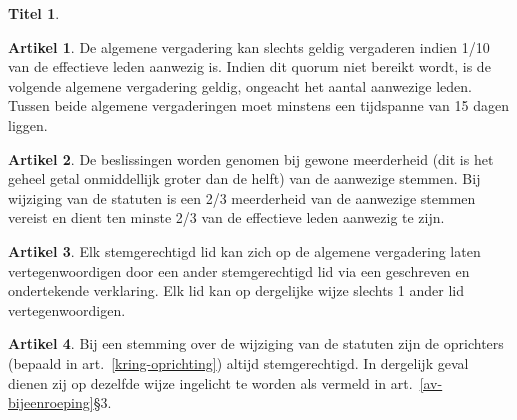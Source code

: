 \documentclass[a4paper,10pt]{article}
\theoremstyle{definition}
\newtheorem{titel}{\newline\Large Titel}
\newtheorem{artikel}{\large Artikel}
\newcommand{\ttextcr}{\hfill\newline}
\begin{document}
\begin{titel}
  \begin{artikel}\ttextcr
    De algemene vergadering kan slechts geldig vergaderen indien 1/10 van de effectieve leden aanwezig is.
    Indien dit quorum niet bereikt wordt, is de volgende algemene vergadering geldig, ongeacht het aantal aanwezige leden.
    Tussen beide algemene vergaderingen moet minstens een tijdspanne van 15 dagen liggen.
  \end{artikel}

  \begin{artikel}\label{av-beslissen}\ttextcr
    De beslissingen worden genomen bij gewone meerderheid (dit is het geheel getal onmiddellijk groter dan de helft) van de aanwezige stemmen.
    Bij wijziging van de statuten is een 2/3 meerderheid van de aanwezige stemmen vereist en dient ten minste 2/3 van de effectieve leden aanwezig te zijn.
  \end{artikel}

  \begin{artikel}\ttextcr
    Elk stemgerechtigd lid kan zich op de algemene vergadering laten vertegenwoordigen door een ander stemgerechtigd lid via een geschreven en ondertekende verklaring.
    Elk lid kan op dergelijke wijze slechts 1 ander lid vertegenwoordigen.
  \end{artikel}

  \begin{artikel}\ttextcr
    Bij een stemming over de wijziging van de statuten zijn de oprichters (bepaald in art.~\ref{kring-oprichting}) altijd stemgerechtigd.
    In dergelijk geval dienen zij op dezelfde wijze ingelicht te worden als vermeld in art.~\ref{av-bijeenroeping}\S3.
  \end{artikel}


\end{titel}

\end{document}
